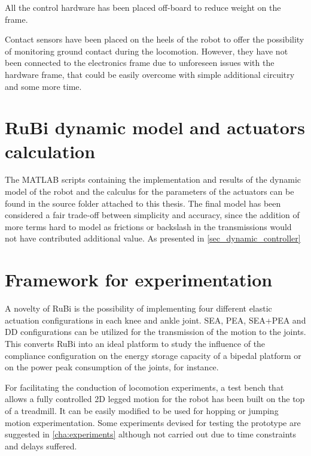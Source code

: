 All the control hardware has been placed off-board to reduce weight on the frame.

Contact sensors have been placed on the heels of the robot to offer the possibility of monitoring ground contact during the locomotion.
However, they have not been connected to the electronics frame due to unforeseen issues with the hardware frame, that could be easily overcome with simple additional circuitry and some more time.

\section{RuBi dynamic model and actuators calculation} %
\label{sec:rubi_dynamic_model_and_actuators_calculation}
The MATLAB scripts containing the implementation and results of the dynamic model of the robot and the calculus for the parameters of the actuators can be found in the source folder attached to this thesis.
The final model has been considered a fair trade-off between simplicity and accuracy, since the addition of more terms hard to model as frictions or backslash in the transmissions would not have contributed additional value.
As presented in \ref{sec_dynamic_controller}


\section{Framework for experimentation} %
\label{sec:framework_for_experimentation}
A novelty of RuBi is the possibility of implementing four different elastic actuation configurations in each knee and ankle joint.
SEA, PEA, SEA+PEA and DD configurations can be utilized for the transmission of the motion to the joints.
This converts RuBi into an ideal platform to study the influence of the compliance configuration on the energy storage capacity of a bipedal platform or on the power peak consumption of the joints, for instance.

For facilitating the conduction of locomotion experiments, a test bench that allows a fully controlled 2D legged motion for the robot has been built on the top of a treadmill.
It can be easily modified to be used for hopping or jumping motion experimentation.
Some experiments devised for testing the prototype are suggested in \ref{cha:experiments} although not carried out due to time constraints and delays suffered.

